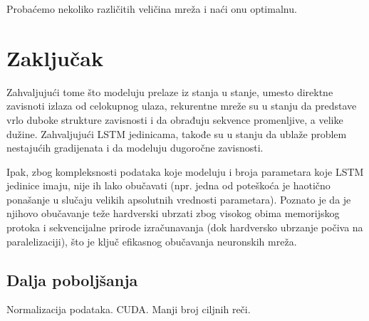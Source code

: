 \documentclass[a4paper]{article}
\begin{document}
Probaćemo nekoliko različitih veličina mreža i naći onu optimalnu. 


\section{Zaključak}

Zahvaljujući tome što modeluju prelaze iz stanja u stanje, umesto direktne zavisnoti izlaza od celokupnog ulaza, rekurentne mreže su u stanju da predstave vrlo duboke strukture zavisnosti i da obrađuju sekvence promenljive, a velike dužine. Zahvaljujući LSTM jedinicama, takođe su u stanju da ublaže problem nestajućih gradijenata i da modeluju dugoročne zavisnosti. 

Ipak, zbog kompleksnosti podataka koje modeluju i broja parametara koje LSTM jedinice imaju, nije ih lako obučavati (npr. jedna od poteškoća je haotično ponašanje u slučaju velikih apsolutnih vrednosti parametara). Poznato je da je njihovo obučavanje teže hardverski ubrzati zbog visokog obima memorijskog protoka i sekvencijalne prirode izračunavanja (dok hardversko ubrzanje počiva na paralelizaciji), što je ključ efikasnog obučavanja neuronskih mreža.

\subsection{Dalja poboljšanja}

Normalizacija podataka. CUDA. Manji broj ciljnih reči.

\label{sec:zakljucak}




\appendix
 

\end{document}
